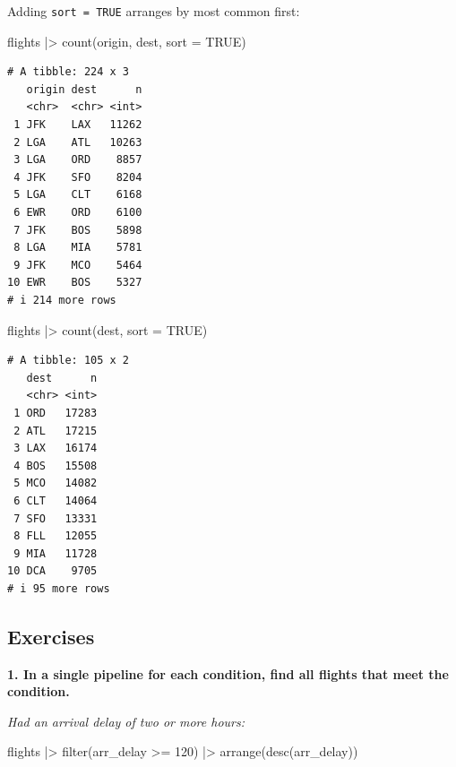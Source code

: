 \documentclass[
  letterpaper,
  DIV=11,
  numbers=noendperiod]{scrreprt}
\newenvironment{Shaded}{\begin{snugshade}}{\end{snugshade}}
\newcommand{\AttributeTok}[1]{\textcolor[rgb]{0.40,0.45,0.13}{#1}}
\newcommand{\ConstantTok}[1]{\textcolor[rgb]{0.56,0.35,0.01}{#1}}
\newcommand{\DecValTok}[1]{\textcolor[rgb]{0.68,0.00,0.00}{#1}}
\newcommand{\FunctionTok}[1]{\textcolor[rgb]{0.28,0.35,0.67}{#1}}
\newcommand{\NormalTok}[1]{\textcolor[rgb]{0.00,0.23,0.31}{#1}}
\newcommand{\SpecialCharTok}[1]{\textcolor[rgb]{0.37,0.37,0.37}{#1}}
\begin{document}
Adding \texttt{sort\ =\ TRUE} arranges by most common first:

\begin{Shaded}
\begin{Highlighting}[]
\NormalTok{flights }\SpecialCharTok{|\textgreater{}}
  \FunctionTok{count}\NormalTok{(origin, dest, }\AttributeTok{sort =} \ConstantTok{TRUE}\NormalTok{)}
\end{Highlighting}
\end{Shaded}

\begin{verbatim}
# A tibble: 224 x 3
   origin dest      n
   <chr>  <chr> <int>
 1 JFK    LAX   11262
 2 LGA    ATL   10263
 3 LGA    ORD    8857
 4 JFK    SFO    8204
 5 LGA    CLT    6168
 6 EWR    ORD    6100
 7 JFK    BOS    5898
 8 LGA    MIA    5781
 9 JFK    MCO    5464
10 EWR    BOS    5327
# i 214 more rows
\end{verbatim}

\begin{Shaded}
\begin{Highlighting}[]
\NormalTok{flights }\SpecialCharTok{|\textgreater{}}
  \FunctionTok{count}\NormalTok{(dest, }\AttributeTok{sort =} \ConstantTok{TRUE}\NormalTok{)}
\end{Highlighting}
\end{Shaded}

\begin{verbatim}
# A tibble: 105 x 2
   dest      n
   <chr> <int>
 1 ORD   17283
 2 ATL   17215
 3 LAX   16174
 4 BOS   15508
 5 MCO   14082
 6 CLT   14064
 7 SFO   13331
 8 FLL   12055
 9 MIA   11728
10 DCA    9705
# i 95 more rows
\end{verbatim}

\subsection{Exercises}\label{exercises-4}

\textbf{1. In a single pipeline for each condition, find all flights
that meet the condition.}

\emph{Had an arrival delay of two or more hours:}

\begin{Shaded}
\begin{Highlighting}[]
\NormalTok{flights }\SpecialCharTok{|\textgreater{}}
  \FunctionTok{filter}\NormalTok{(arr\_delay }\SpecialCharTok{\textgreater{}=} \DecValTok{120}\NormalTok{) }\SpecialCharTok{|\textgreater{}}
  \FunctionTok{arrange}\NormalTok{(}\FunctionTok{desc}\NormalTok{(arr\_delay))}
\end{Highlighting}
\end{Shaded}
\end{document}
